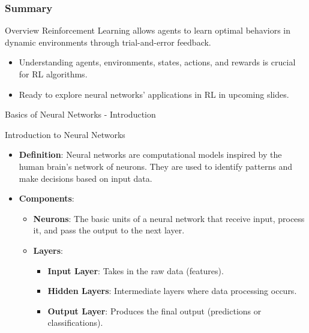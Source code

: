 \documentclass[aspectratio=169]{beamer}
\begin{document}
\begin{frame}[fragile]
    \frametitle{Summary}
    \begin{block}{Overview}
        Reinforcement Learning allows agents to learn optimal behaviors in dynamic environments through trial-and-error feedback.
    \end{block}
    \begin{itemize}
        \item Understanding agents, environments, states, actions, and rewards is crucial for RL algorithms.
        \item Ready to explore neural networks' applications in RL in upcoming slides.
    \end{itemize}
\end{frame}

\begin{frame}[fragile]{Basics of Neural Networks - Introduction}
    \begin{block}{Introduction to Neural Networks}
        \begin{itemize}
            \item \textbf{Definition}: Neural networks are computational models inspired by the human brain's network of neurons. They are used to identify patterns and make decisions based on input data.
            \item \textbf{Components}:
            \begin{itemize}
                \item \textbf{Neurons}: The basic units of a neural network that receive input, process it, and pass the output to the next layer.
                \item \textbf{Layers}:
                \begin{itemize}
                    \item \textbf{Input Layer}: Takes in the raw data (features).
                    \item \textbf{Hidden Layers}: Intermediate layers where data processing occurs.
                    \item \textbf{Output Layer}: Produces the final output (predictions or classifications).
                \end{itemize}
            \end{itemize}
        \end{itemize}
    \end{block}
\end{frame}
\end{document}
